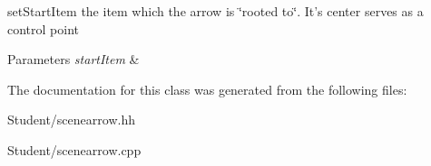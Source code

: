 set\-Start\-Item the item which the arrow is \char`\"{}rooted to\char`\"{}. It's center serves as a control point 


\begin{DoxyParams}{Parameters}
{\em start\-Item} & \\
\hline
\end{DoxyParams}


The documentation for this class was generated from the following files\-:\begin{DoxyCompactItemize}
\item 
Student/scenearrow.\-hh\item 
Student/scenearrow.\-cpp\end{DoxyCompactItemize}
